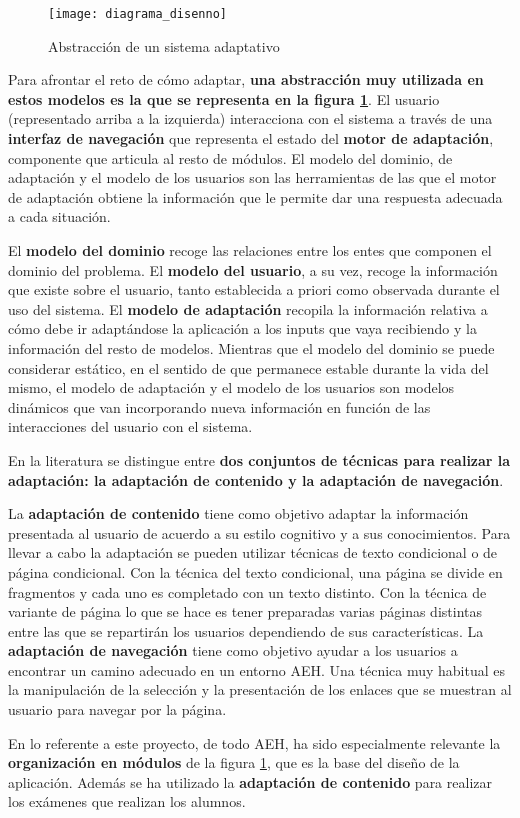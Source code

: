 \begin{figure}[htp!]
	\centering
	\texttt{[image: diagrama\_disenno]}
	\caption{Abstracción de un sistema adaptativo}
	\label{fig:diagrama_disenno}
\end{figure}

Para afrontar el reto de cómo adaptar, \textbf{una abstracción muy utilizada en estos modelos es la que se representa en la figura \ref{fig:diagrama_disenno}}. El usuario (representado arriba a la izquierda) interacciona con el sistema a través de una \textbf{interfaz de navegación} que representa el estado del \textbf{motor de adaptación}, componente que articula al resto de módulos. El modelo del dominio, de adaptación y el modelo de los usuarios son las herramientas de las que el motor de adaptación obtiene la información que le permite dar una respuesta adecuada a cada situación. 

El \textbf{modelo del dominio} recoge las relaciones entre los entes que componen el dominio del problema. El \textbf{modelo del usuario}, a su vez, recoge la información que existe sobre el usuario, tanto establecida a priori como observada durante el uso del sistema. El \textbf{modelo de adaptación} recopila la información relativa a cómo debe ir adaptándose la aplicación a los inputs que vaya recibiendo y la información del resto de modelos. Mientras que el modelo del dominio se puede considerar estático, en el sentido de que permanece estable durante la vida del mismo, el modelo de adaptación y el modelo de los usuarios son modelos dinámicos que van incorporando nueva información en función de las interacciones del usuario con el sistema\cite{Benyon93}.

En la literatura se distingue entre \textbf{dos conjuntos de técnicas para realizar la adaptación: la adaptación de contenido y la adaptación de navegación}\cite{Brusilovsky98}. 

La \textbf{adaptación de contenido} tiene como objetivo adaptar la información presentada al usuario de acuerdo a su estilo cognitivo y a sus conocimientos. Para llevar a cabo la adaptación se pueden utilizar técnicas de texto condicional o de página condicional. Con la técnica del texto condicional, una página se divide en fragmentos y cada uno es completado con un texto distinto. Con la técnica de variante de página lo que se hace es tener preparadas varias páginas distintas entre las que se repartirán los usuarios dependiendo de sus características. La \textbf{adaptación de navegación} tiene como objetivo ayudar a los usuarios a encontrar un camino adecuado en un entorno \acrshort{AEH}. Una técnica muy habitual es la manipulación de la selección y la presentación de los enlaces que se muestran al usuario para navegar por la página\cite{Triantafillou03}.

En lo referente a este proyecto, de todo \acrshort{AEH}, ha sido especialmente relevante la \textbf{organización en módulos} de la figura \ref{fig:diagrama_disenno}, que es la base del diseño de la aplicación. Además se ha utilizado la \textbf{adaptación de contenido}  para realizar los exámenes que realizan los alumnos.


